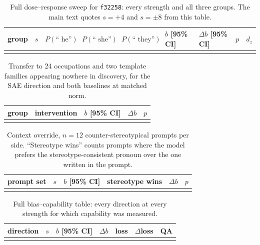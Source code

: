 \documentclass{article}
\newcommand{\phe}{P(\text{`` he''})}
\newcommand{\pshe}{P(\text{`` she''})}
\newcommand{\pthey}{P(\text{`` they''})}
\newcommand{\ff}[1]{\texttt{f#1}}
\begin{document}
\begin{table}[h]
\centering
\caption{Full dose--response sweep for \ff{32258}: every strength and all three groups.
The main text quotes $s=+4$ and $s=\pm8$ from this table.}
\label{tab:dosefull}
\scriptsize
\setlength{\tabcolsep}{3pt}
\begin{tabular}{lrrrrllrr}
\toprule
group & $s$ & $\phe$ & $\pshe$ & $\pthey$ & $b$ [95\% CI] & $\Delta b$ [95\% CI] & $p$ & $d_z$ \\
\midrule
 \\
\bottomrule
\end{tabular}
\end{table}

\begin{table}[h]
\centering
\caption{Transfer to 24 occupations and two template families appearing nowhere in
discovery, for the SAE direction and both baselines at matched norm.}
\label{tab:heldout}
\small
\begin{tabular}{llllr}
\toprule
group & intervention & $b$ [95\% CI] & $\Delta b$ & $p$ \\
\midrule
 \\
\bottomrule
\end{tabular}
\end{table}

\begin{table}[h]
\centering
\caption{Context override, $n=12$ counter-stereotypical prompts per side. ``Stereotype
wins'' counts prompts where the model prefers the stereotype-consistent pronoun over the
one written in the prompt.}
\label{tab:override}
\small
\begin{tabular}{lllllr}
\toprule
prompt set & $s$ & $b$ [95\% CI] & stereotype wins & $\Delta b$ & $p$ \\
\midrule
 \\
\bottomrule
\end{tabular}
\end{table}

\begin{table}[h]
\centering
\caption{Full bias--capability table: every direction at every strength for which
capability was measured.}
\label{tab:baselinesfull}
\small
\begin{tabular}{llllrrr}
\toprule
direction & $s$ & $b$ [95\% CI] & $\Delta b$ & loss & $\Delta$loss & QA \\
\midrule
 \\
\bottomrule
\end{tabular}
\end{table}
\end{document}
